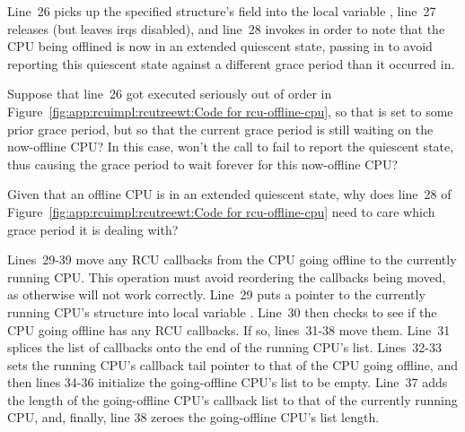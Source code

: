 Line~26 picks up the specified  structure's
 field into the local variable ,
line~27 releases  (but leaves irqs disabled),
and line~28 invokes  in order to note that the
CPU being offlined is now in an extended quiescent state, passing
in  to avoid reporting this quiescent state against
a different grace period than it occurred in.

\QuickQuiz{}
	Suppose that line~26 got executed seriously out of order in
	Figure~\ref{fig:app:rcuimpl:rcutreewt:Code for rcu-offline-cpu},
	so that  is set to some prior grace period, but
	so that the current grace period is still waiting on the
	now-offline CPU?
	In this case, won't the call to  fail to
	report the quiescent state, thus causing the grace period
	to wait forever for this now-offline CPU?
 \QuickQuizEnd

\QuickQuiz{}
	Given that an offline CPU is in an extended quiescent state,
	why does line~28 of
	Figure~\ref{fig:app:rcuimpl:rcutreewt:Code for rcu-offline-cpu}
	need to care which grace period it is
	dealing with?
 \QuickQuizEnd

Lines~29-39 move any RCU callbacks from the CPU going offline to the
currently running CPU.
This operation must avoid reordering the callbacks being moved, as
otherwise  will not work correctly.
Line~29 puts a pointer to the currently running CPU's 
structure into local variable .
Line~30 then checks to see if the CPU going offline has any RCU callbacks.
If so, lines~31-38 move them.
Line~31 splices the list of callbacks onto the end of the running CPU's
list.
Lines~32-33 sets the running CPU's callback tail pointer to that of
the CPU going offline, and then lines 34-36 initialize the going-offline
CPU's list to be empty.
Line~37 adds the length of the going-offline CPU's callback list to
that of the currently running CPU, and, finally, line 38 zeroes the
going-offline CPU's list length.

